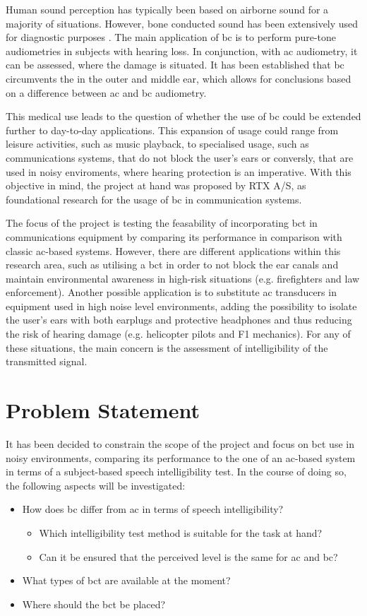 Human sound perception has typically been based on airborne sound for a majority of situations. However, bone conducted sound has been extensively used for diagnostic purposes \citep{iso_389-3}. The main application of \gls{bc} is to perform pure-tone audiometries in subjects with hearing loss. In conjunction, with \gls{ac} audiometry, it can be assessed, where the damage is situated. It has been established that \gls{bc} circumvents the in the outer and middle ear, which allows for conclusions based on a difference between \gls{ac} and \gls{bc} audiometry.

This medical use leads to the question of whether the use of \gls{bc} could be extended further to day-to-day applications. This expansion of usage could range from leisure activities, such as music playback, to specialised usage, such as communications systems, that do not block the user's ears or conversly, that are used in noisy enviroments, where hearing protection is an imperative. With this objective in mind, the project at hand was proposed by RTX A/S, as foundational research for the usage of \gls{bc} in communication systems.

The focus of the project is testing the feasability of incorporating \gls{bct} in communications equipment by comparing its performance in comparison with classic \gls{ac}-based systems. However, there are different applications within this research area, such as utilising a \gls{bct} in order to not block the ear canals and maintain environmental awareness in high-risk situations (e.g. firefighters and law enforcement). Another possible application is to substitute \gls{ac} transducers in equipment used in high noise level environments, adding the possibility to isolate the user's ears with both earplugs and protective headphones and thus reducing the risk of hearing damage (e.g. helicopter pilots and F1 mechanics). For any of these situations, the main concern is the assessment of intelligibility of the transmitted signal.

\section{Problem Statement}
It has been decided to constrain the scope of the project and focus on \gls{bct} use in noisy environments, comparing its performance to the one of an \gls{ac}-based system in terms of a subject-based speech intelligibility test. In the course of doing so, the following aspects will be investigated:
\begin{itemize}
\item How does \gls{bc} differ from \gls{ac} in terms of speech intelligibility?
\begin{itemize}
\item Which intelligibility test method is suitable for the task at hand?
\item Can it be ensured that the perceived level is the same for \gls{ac} and \gls{bc}?
\end{itemize}
\item What types of \gls{bct} are available at the moment?
\item Where should the \gls{bct} be placed?
\end{itemize}